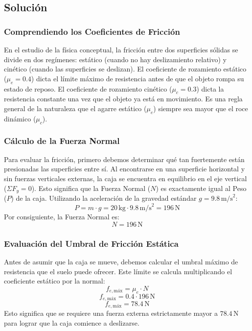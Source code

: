 \documentclass[12pt]{article}
\begin{document}
\subsection*{Solución}

\subsubsection*{Comprendiendo los Coeficientes de Fricción}
En el estudio de la física conceptual, la fricción entre dos superficies sólidas se divide en dos regímenes: estático (cuando no hay deslizamiento relativo) y cinético (cuando las superficies se deslizan). El coeficiente de rozamiento estático ($\mu_e = 0.4$) dicta el límite máximo de resistencia antes de que el objeto rompa su estado de reposo. El coeficiente de rozamiento cinético ($\mu_c = 0.3$) dicta la resistencia constante una vez que el objeto ya está en movimiento. Es una regla general de la naturaleza que el agarre estático ($\mu_e$) siempre sea mayor que el roce dinámico ($\mu_c$).

\subsubsection*{Cálculo de la Fuerza Normal}
Para evaluar la fricción, primero debemos determinar qué tan fuertemente están presionadas las superficies entre sí. Al encontrarse en una superficie horizontal y sin fuerzas verticales externas, la caja se encuentra en equilibrio en el eje vertical ($\Sigma F_y = 0$). Esto significa que la Fuerza Normal ($N$) es exactamente igual al Peso ($P$) de la caja.
Utilizando la aceleración de la gravedad estándar $g = 9.8 \, \text{m/s}^2$:
\begin{equation}
    P = m \cdot g = 20 \, \text{kg} \cdot 9.8 \, \text{m/s}^2 = 196 \, \text{N}
\end{equation}
Por consiguiente, la Fuerza Normal es:
\begin{equation}
    N = 196 \, \text{N}
\end{equation}

\subsubsection*{Evaluación del Umbral de Fricción Estática}
Antes de asumir que la caja se mueve, debemos calcular el umbral máximo de resistencia que el suelo puede ofrecer. Este límite se calcula multiplicando el coeficiente estático por la normal:
\begin{equation}
    f_{e,\text{máx}} = \mu_e \cdot N
\end{equation}
\begin{equation}
    f_{e,\text{máx}} = 0.4 \cdot 196 \, \text{N}
\end{equation}
\begin{equation}
    f_{e,\text{máx}} = 78.4 \, \text{N}
\end{equation}
Esto significa que se requiere una fuerza externa estrictamente mayor a $78.4 \, \text{N}$ para lograr que la caja comience a deslizarse.
\end{document}
